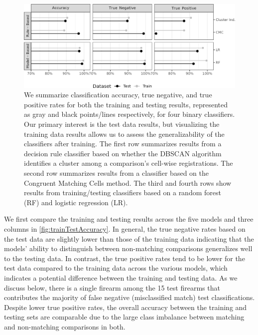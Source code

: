 \documentclass[reprint]{JASA}
\begin{document}
\begin{figure}[htbp]

{\centering \includegraphics[width=\textwidth]{images/resultsPlots/classifResultsPlt_trainTest} 

}

\caption{\label{fig:trainTestAccuracy} We summarize classification accuracy, true negative, and true positive rates for both the training and testing results, represented as gray and black points/lines respectively, for four binary classifiers. Our primary interest is the test data results, but visualizing the training data results allows us to assess the generalizability of the classifiers after training. The first row summarizes results from a decision rule classifier based on whether the DBSCAN algorithm identifies a cluster among a comparison's cell-wise registrations. The second row summarizes results from a classifier based on the Congruent Matching Cells method. The third and fourth rows show results from training/testing classifiers based on a random forest (RF) and logistic regression (LR).}\label{fig:unnamed-chunk-9}
\end{figure}

We first compare the training and testing results across the five models
and three columns in \autoref{fig:trainTestAccuracy}. In general, the
true negative rates based on the test data are slightly lower than those
of the training data indicating that the models' ability to distinguish
between non-matching comparisons generalizes well to the testing data.
In contrast, the true positive rates tend to be lower for the test data
compared to the training data across the various models, which indicates
a potential difference between the training and testing data. As we
discuss below, there is a single firearm among the 15 test firearms that
contributes the majority of false negative (misclassified match) test
classifications. Despite lower true positive rates, the overall accuracy
between the training and testing sets are comparable due to the large
class imbalance between matching and non-matching comparisons in both.
\end{document}

